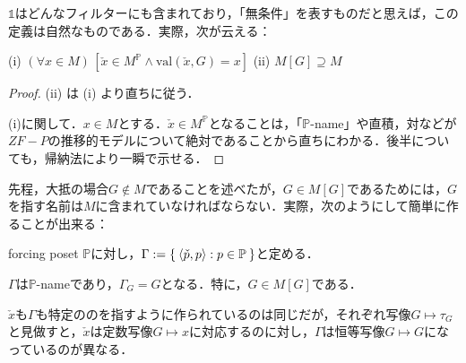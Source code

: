 \documentclass[a4j]{bxjsarticle}
\newcommand{\val}{\mathrm{val}}
\begin{document}
$\mathds{1}$はどんなフィルターにも含まれており，「無条件」を表すものだと思えば，この定義は自然なものである．実際，次が云える：
\begin{lemma}
 (i) $(\forall x \in M)\, \left[ \check{x} \in M^\mathbb{P} \wedge \val(\check{x}, G) = x\right]$\label{cond:x-check-is-m-p-name}
  \quad (ii) $M[G] \supseteq M$\label{cond:mg-includes-m}
\end{lemma}
\begin{proof}
 (ii) は (i) より直ちに従う．

 (i)に関して．$x \in M$とする．$\check{x} \in M^\mathbb{P}$となることは，「$\mathbb{P}$-name」や直積，対などが$ZF-P$の推移的モデルについて絶対であることから直ちにわかる．後半についても，帰納法により一瞬で示せる．\mbox{}
\end{proof}

先程，大抵の場合$G \notin M$であることを述べたが，$G \in M[G]$であるためには，$G$を指す名前は$M$に含まれていなければならない．実際，次のようにして簡単に作ることが出来る：
\begin{definition}
 forcing poset $\mathbb{P}$に対し，$\Gamma \mathrel{:=} \Set{ \braket{\check{p}, p} : p \in \mathbb{P}}$と定める．
\end{definition}
\begin{lemma}
 $\Gamma$は$\mathbb{P}$-nameであり，$\Gamma_G = G$となる．特に，$G \in M[G]$である．
\end{lemma}

$\check{x}$も$\Gamma$も特定ののを指すように作られているのは同じだが，それぞれ写像$G \mapsto \tau_G$と見做すと，$\check{x}$は定数写像$G \mapsto x$に対応するのに対し，$\Gamma$は恒等写像$G \mapsto G$になっているのが異なる．
\end{document}
